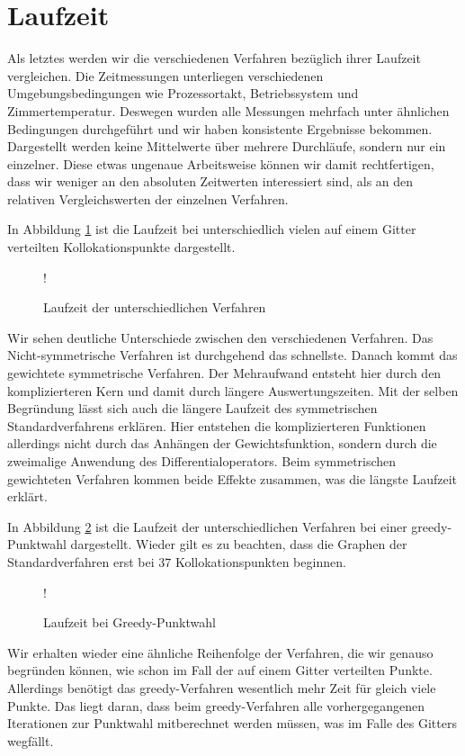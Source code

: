 \section{Laufzeit}
Als letztes werden wir die verschiedenen Verfahren bezüglich ihrer Laufzeit vergleichen. Die Zeitmessungen unterliegen verschiedenen Umgebungsbedingungen wie Prozessortakt, Betriebssystem und Zimmertemperatur. Deswegen wurden alle Messungen mehrfach unter ähnlichen Bedingungen durchgeführt und wir haben konsistente Ergebnisse bekommen. Dargestellt werden keine Mittelwerte über mehrere Durchläufe, sondern nur ein einzelner. Diese etwas ungenaue Arbeitsweise können wir damit rechtfertigen, dass wir weniger an den absoluten Zeitwerten interessiert sind, als an den relativen Vergleichswerten der einzelnen Verfahren.

In Abbildung \ref{fig:Laufzeit} ist die Laufzeit bei unterschiedlich vielen auf einem Gitter verteilten Kollokationspunkte dargestellt.
\begin{figure}[ht]
\centering
\resizebox {\columnwidth} {!} {

}
\caption{Laufzeit der unterschiedlichen Verfahren}
\label{fig:Laufzeit}
\end{figure}

Wir sehen deutliche Unterschiede zwischen den verschiedenen Verfahren. Das Nicht-symmetrische Verfahren ist durchgehend das schnellste. Danach kommt das gewichtete symmetrische Verfahren. Der Mehraufwand entsteht hier durch den komplizierteren Kern und damit durch längere Auswertungszeiten. Mit der selben Begründung lässt sich auch die längere Laufzeit des symmetrischen Standardverfahrens erklären. Hier entstehen die komplizierteren Funktionen allerdings nicht durch das Anhängen der Gewichtsfunktion, sondern durch die zweimalige Anwendung des Differentialoperators. Beim symmetrischen gewichteten Verfahren kommen beide Effekte zusammen, was die längste Laufzeit erklärt.

In Abbildung \ref{fig:Laufzeit-greedy} ist die Laufzeit der unterschiedlichen Verfahren bei einer greedy-Punktwahl dargestellt. Wieder gilt es zu beachten, dass die Graphen der Standardverfahren erst bei $37$ Kollokationspunkten beginnen.
\begin{figure}[ht]
\centering
\resizebox {\columnwidth} {!} {

}
\caption{Laufzeit bei Greedy-Punktwahl}
\label{fig:Laufzeit-greedy}
\end{figure}

Wir erhalten wieder eine ähnliche Reihenfolge der Verfahren, die wir genauso begründen können, wie schon im Fall der auf einem Gitter verteilten Punkte. Allerdings benötigt das greedy-Verfahren wesentlich mehr Zeit für gleich viele Punkte. Das liegt daran, dass beim greedy-Verfahren alle vorhergegangenen Iterationen zur Punktwahl mitberechnet werden müssen, was im Falle des Gitters wegfällt.
